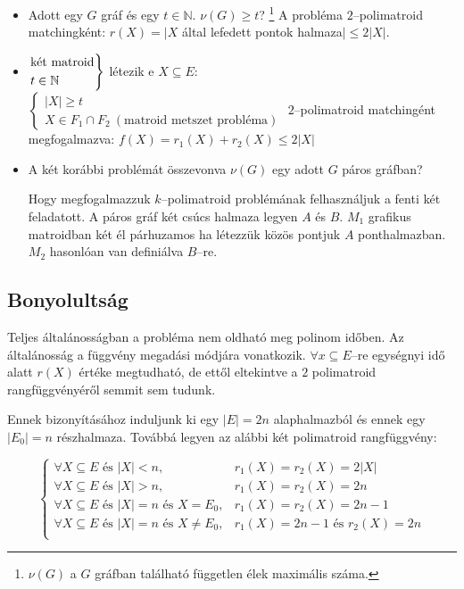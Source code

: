 \begin{itemize}
  \item Adott egy $G$ gráf és egy $t \in \mathbb{N}$. $\nu(G) \geq t$? \footnote{
   $\nu(G)$ a $G$ gráfban található független élek maximális száma.
  } A probléma $2$--polimatroid matchingként: $r(X)=|X$
  által lefedett pontok halmaza$| \leq 2|X|$.
  \item $\begin{rcases}
  \mbox{két matroid} \\
  t \in \mathbb{N}
  \end{rcases}$ létezik  e $X \subseteq E$: $\begin{cases}
  |X| \geq t \\
  X \in F_1 \cap F_2~(\mbox{matroid metszet probléma})
  \end{cases}$ 
  $2$--polimatroid matchingént megfogalmazva: $f(X)=r_1(X)+r_2(X) \leq 2|X|$
  \item A két korábbi problémát összevonva $\nu(G)$ egy adott $G$ páros gráfban?
  
  Hogy megfogalmazzuk $k$--polimatroid problémának felhasználjuk a fenti két
  feladatott. A páros gráf két csúcs halmaza legyen $A$ és $B$. $M_1$ grafikus
  matroidban két él párhuzamos ha létezzük közös pontjuk $A$ ponthalmazban.
  $M_2$ hasonlóan van definiálva $B$--re. 
\end{itemize}

\subsection{Bonyolultság}
Teljes általánosságban a probléma nem oldható meg polinom időben. Az általánosság
a függvény megadási módjára vonatkozik. $\forall x \subseteq E$--re egységnyi
idő alatt $r(X)$ értéke megtudható, de ettől eltekintve a $2$ polimatroid
rangfüggvényéről semmit sem tudunk.

Ennek bizonyításához induljunk ki egy $|E|=2n$ alaphalmazból és ennek egy
$|E_0|=n$ részhalmaza. Továbbá legyen az alábbi két polimatroid rangfüggvény:

\[
\begin{cases}
\forall X \subseteq E \mbox{ és } |X|<n, & r_1(X)=r_2(X)=2|X| \\
\forall X \subseteq E \mbox{ és } |X|>n, & r_1(X)=r_2(X)=2n \\
\forall X \subseteq E \mbox{ és } |X|=n \mbox{ és } X = E_0, & r_1(X)=r_2(X)=2n-1\\
\forall X \subseteq E \mbox{ és } |X|=n \mbox{ és } X \neq E_0, & r_1(X)=2n-1 \mbox{ és }r_2(X)=2n\\
\end{cases}
\]

